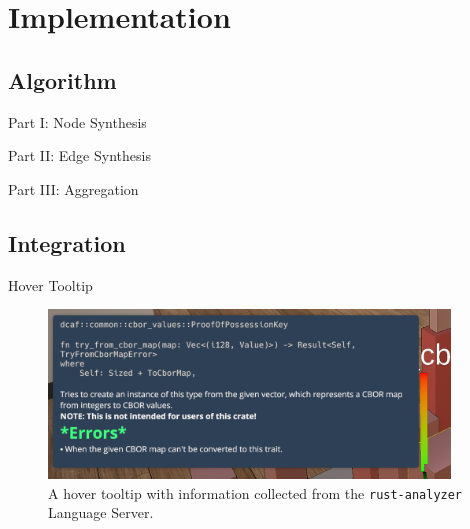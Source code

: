 \documentclass[xcolor={dvipsnames},aspectratio=169,compress,final]{beamer}
\begin{document}
\section{Implementation}

\subsection{Algorithm}

\begin{frame}{Part I: Node Synthesis}
\end{frame}

\begin{frame}{Part II: Edge Synthesis}
\end{frame}

\begin{frame}{Part III: Aggregation}

\end{frame}

\subsection{Integration}

\begin{frame}{Hover Tooltip}
	\begin{figure}
		\begin{center}
			\includegraphics[trim={0.3cm 0.8cm 2.7cm 0.3cm},clip,width=0.95\textwidth]{figures/HoverInfo}
		\end{center}
		\caption{A hover tooltip with information collected from the \texttt{rust-analyzer} Language Server.}
	\end{figure}
\end{frame}
\end{document}
